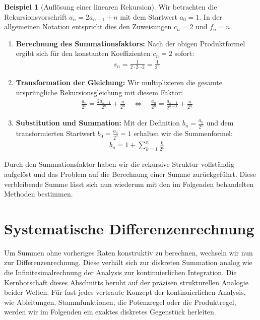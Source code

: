 \documentclass{article}
\theoremstyle{definition}
\newtheorem{bsp}[thm]{Beispiel}
\begin{document}
\begin{bsp}[Auflösung einer linearen Rekursion]
Wir betrachten die Rekursionsvorschrift $a_n = 2 a_{n-1} + n$ mit dem Startwert $a_0 = 1$. In der allgemeinen Notation entspricht dies den Zuweisungen $c_n = 2$ und $f_n = n$.
\begin{enumerate}
    \item \textbf{Berechnung des Summationsfaktors:} Nach der obigen Produktformel ergibt sich für den konstanten Koeffizienten $c_n = 2$ sofort:
    \begin{align*}
        s_n = \frac{1}{2 \cdot 2 \cdots 2} = \frac{1}{2^n}
    \end{align*}
    \item \textbf{Transformation der Gleichung:} Wir multiplizieren die gesamte ursprüngliche Rekursionsgleichung mit diesem Faktor:
    \begin{align*}
        \frac{a_n}{2^n} = \frac{2 a_{n-1}}{2^n} + \frac{n}{2^n} \quad \Longleftrightarrow \quad \frac{a_n}{2^n} = \frac{a_{n-1}}{2^{n-1}} + \frac{n}{2^n}
    \end{align*}
    \item \textbf{Substitution und Summation:} Mit der Definition $b_n = \frac{a_n}{2^n}$ und dem transformierten Startwert $b_0 = \frac{a_0}{2^0} = 1$ erhalten wir die Summenformel:
    \begin{align*}
        b_n = 1 + \sum_{k=1}^n \frac{k}{2^k}
    \end{align*}
\end{enumerate}
Durch den Summationsfaktor haben wir die rekursive Struktur vollständig aufgelöst und das Problem auf die Berechnung einer Summe zurückgeführt. Diese verbleibende Summe lässt sich nun wiederum mit den im Folgenden behandelten Methoden bestimmen.
\end{bsp}

\section{Systematische Differenzenrechnung}
Um Summen ohne vorheriges Raten konstruktiv zu berechnen, wechseln wir nun zur Differenzenrechnung. Diese verhält sich zur diskreten Summation analog wie die Infinitesimalrechnung der Analysis zur kontinuierlichen Integration. Die Kernbotschaft dieses Abschnitts beruht auf der präzisen strukturellen Analogie beider Welten. Für fast jedes vertraute Konzept der kontinuierlichen Analysis, wie Ableitungen, Stammfunktionen, die Potenzregel oder die Produktregel, werden wir im Folgenden ein exaktes diskretes Gegenstück herleiten.
\end{document}
